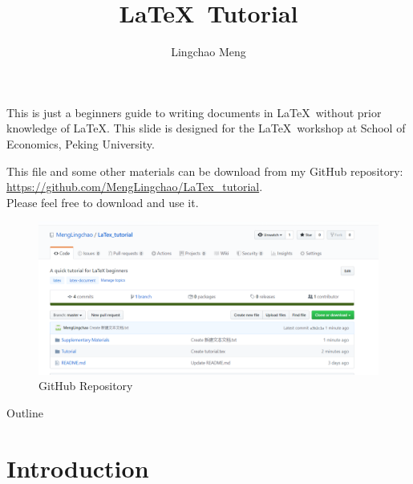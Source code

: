 \documentclass[11pt]{beamer}
\begin{document}
	
	\begin{CJK*}{UTF8}{gkai}
		
	\author[LC Meng]{Lingchao Meng}
	\title[LaTeX Tutorial]{\LaTeX\ Tutorial}
\begin{frame}[plain]
    \maketitle
\end{frame}

\begin{frame}
	This is  just a beginners guide to writing documents in \LaTeX\ without prior knowledge of \LaTeX. This slide is designed for the \LaTeX\ workshop at School of Economics, Peking University.
\end{frame}

\begin{frame}
	This file and some other materials can be download from my GitHub repository: \underline{https://github.com/MengLingchao/LaTex\_tutorial}. \\Please feel free to download and use it.
	\vskip 0.25cm
	\begin{figure}
		\centering
		\includegraphics[width=0.7\linewidth]{figs/GitHub}
		\caption{GitHub Repository}
		\label{fig:github}
	\end{figure}
	
\end{frame}

\begin{frame}{Outline}
	\tableofcontents
\end{frame}

\section{Introduction}
\begin{frame}
	\sectionpage
\end{frame}


\end{CJK*}
\end{document}
